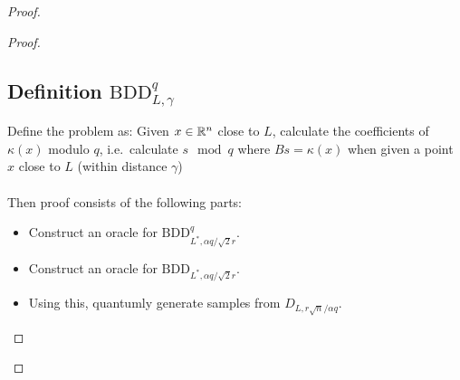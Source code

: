 \begin{proof}
\begin{proof}
\subsection{Definition $\mathrm{BDD}_{L, \gamma}^q$}
Define the problem as: Given $x \in \mathbb{R}^n$ close to $L$, calculate the coefficients of $\kappa(x)$ modulo $q$, i.e.\ calculate $s \mod q$ where $Bs = \kappa(x)$ when given a point $x$ close to $L$ (within distance $\gamma$)
\\\\
Then proof consists of the following parts:
\begin{itemize}
\item Construct an oracle for $\mathrm{BDD}_{L^*, \alpha q / \sqrt{2}r}^q$.
\item Construct an oracle for $\mathrm{BDD}_{L^*, \alpha q / \sqrt{2}r}$.
\item Using this, quantumly generate samples from $D_{L, r\sqrt{n}/\alpha q}$.
\end{itemize}


\end{proof}
\end{proof}
